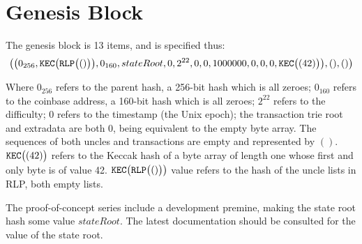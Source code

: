 \documentclass[9pt,oneside]{amsart}
\begin{document}
\section{Genesis Block}\label{app:genesis}

The genesis block is 13 items, and is specified thus:
\begin{equation}
\big( \big( 0_{256}, \mathtt{\tiny KEC}\big(\mathtt{\tiny RLP}\big( () \big)\big), 0_{160}, stateRoot, 0, 2^{22}, 0, 0, 1000000, 0, 0, 0, \mathtt{\tiny KEC}\big( (42) \big) \big), (), () \big)
\end{equation}

Where $0_{256}$ refers to the parent hash, a 256-bit hash which is all zeroes; $0_{160}$ refers to the coinbase address, a 160-bit hash which is all zeroes; $2^{22}$ refers to the difficulty; 0 refers to the timestamp (the Unix epoch); the transaction trie root and extradata are both $0$, being equivalent to the empty byte array. The sequences of both uncles and transactions are empty and represented by $()$. $\mathtt{\tiny KEC}\big( (42) \big)$ refers to the Keccak hash of a byte array of length one whose first and only byte is of value 42. $\mathtt{\tiny KEC}\big(\mathtt{\tiny RLP}\big( () \big)\big)$ value refers to the hash of the uncle lists in RLP, both empty lists.

The proof-of-concept series include a development premine, making the state root hash some value $stateRoot$. The latest documentation should be consulted for the value of the state root.
\end{document}
